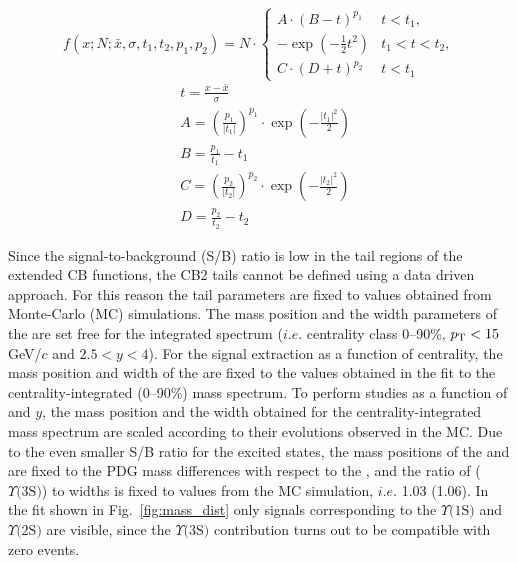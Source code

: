 \begin{equation}\label{eqn:CB2}
f(x;N;\bar{x},\sigma,t_1,t_2,p_1,p_2) = N\cdot\begin{cases} A\cdot(B-t)^{p_1} & t<t_1,\\ -\exp\left(-\frac{1}{2}t^2\right) & t_1<t<t_2,\\C\cdot(D+t)^{p_2} & t<t_1\end{cases}
\end{equation}
\begin{equation}\label{eqn:CB2def}
\begin{aligned}
&t=\frac{x-\bar{x}}{\sigma}
\\&A=\left(\frac{p_1}{|t_1|}\right)^{p_1}\cdot\exp\left(-\frac{|t_1|^2}{2}\right)
\\&B=\frac{p_1}{t_1} - t_1
\\&C=\left(\frac{p_2}{|t_2|}\right)^{p_2}\cdot\exp\left(-\frac{|t_2|^2}{2}\right)
\\&D=\frac{p_2}{t_2} - t_2
\end{aligned}
\end{equation}

Since the signal-to-background (S/B) ratio is low in the tail regions of the extended CB functions, the CB2 tails cannot be defined using a data driven approach.
For this reason the tail parameters are fixed to values obtained from Monte-Carlo (MC) simulations. 
The mass position and the width parameters of the \upsis are set free for the integrated spectrum ($i.e.$ centrality class 0--90\%, $p_{\rm T}<15$ GeV/$c$ and $2.5 < y < 4$).
For the signal extraction as a function of centrality, the mass position  and width of the \upsis are fixed to the values obtained in the fit to the centrality-integrated (0--90\%) mass spectrum. 
To perform studies as a function of \pt and $y$, the mass position and the width obtained for the centrality-integrated mass spectrum are scaled according to their evolutions observed in the MC.
Due to the even smaller S/B ratio for the excited states, the mass positions of the \upsiss and \upsisss are fixed to the PDG mass differences with respect to the \upsis, and the ratio of \upsiss ($\Upsilon\text{(3S)}$) to \upsis widths is fixed to values from the MC simulation, $i.e.$ 1.03 (1.06). 
In the fit shown in Fig.~\ref{fig:mass_dist} only signals corresponding to the $\Upsilon\text{(1S)}$ and $\Upsilon\text{(2S)}$ are visible, since the $\Upsilon\text{(3S)}$ contribution turns out to be compatible with zero events.
 
